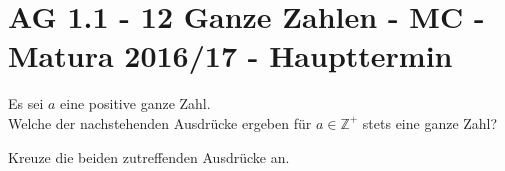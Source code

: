 \section{AG 1.1 - 12 Ganze Zahlen - MC - Matura 2016/17 - Haupttermin}

\begin{beispiel}[AG 1.1]{1} %
	Es sei $a$ eine positive ganze Zahl.\\
			
Welche der nachstehenden Ausdrücke ergeben für $a\in \mathbb{Z}^+$ stets eine ganze Zahl? 

Kreuze die beiden zutreffenden Ausdrücke an.

\end{beispiel}